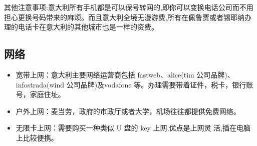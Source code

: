  其他注意事项:意大利所有手机都是可以保号转网的,即你可以变换电话公司而不用担心更换号码带来的麻烦。而且意大利全境无漫游费,所有在佩鲁贾或者锡耶纳办理的电话卡在意大利的其他城市也是一样的资费。 
\subsection{网络}

\begin{itemize}
\item 宽带上网：意大利主要网络运营商包括 fastweb、alice(tim 公司品牌)、infostrada(wind 公司品牌)及vodafone 等。办理需要带着证件，税卡，银行账号，家庭住址。
\item 户外上网：麦当劳，政府的市政厅或者大学，机场往往都提供免费网络。
\item 无限卡上网：需要购买一种类似 U 盘的 key 上网,优点是上网灵 活,插在电脑上比较便携。
\end{itemize}
